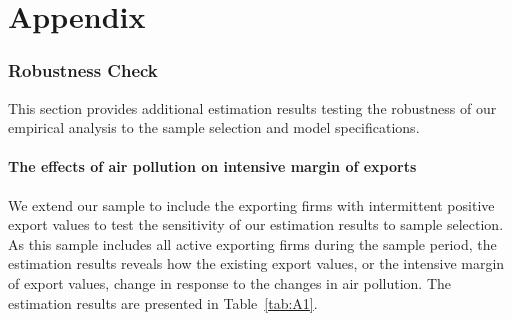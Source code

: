 \documentclass[12pt]{article}
\begin{document}
    \part{Appendix} %
    \parttoc 
    \section{Robustness Check}
This section provides additional estimation results testing the robustness of our empirical analysis to the sample selection and model specifications.      
    \subsection{The effects of air pollution on intensive margin of exports}\label{sec:A.1}
     We extend our sample to include the exporting firms with intermittent positive export values to test the sensitivity of our estimation results to sample selection. As this sample includes all active exporting firms during the sample period, the estimation results reveals how the existing export values, or the intensive margin of export values, change in response to the changes in air pollution.  
     The estimation results are presented in Table~\ref{tab:A1}.
\end{document}
